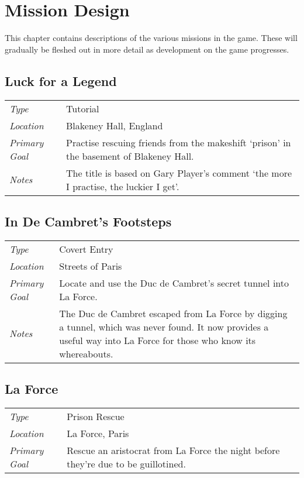 \chapter{Mission Design}

This chapter contains descriptions of the various missions in the game. These will gradually be fleshed out in more detail as development on the game progresses.

\section{Luck for a Legend}

\begin{tabular}{lp{12cm}}
\emph{Type} & Tutorial \\
\emph{Location} & Blakeney Hall, England \\
\emph{Primary Goal} & Practise rescuing friends from the makeshift `prison' in the basement of Blakeney Hall. \\
\emph{Notes} & The title is based on Gary Player's comment `the more I practise, the luckier I get'.
\end{tabular}

\section{In De Cambret's Footsteps}

\begin{tabular}{lp{12cm}}
\emph{Type} & Covert Entry \\
\emph{Location} & Streets of Paris \\
\emph{Primary Goal} & Locate and use the Duc de Cambret's secret tunnel into La Force. \\
\emph{Notes} & The Duc de Cambret escaped from La Force by digging a tunnel, which was never found. It now provides a useful way into La Force for those who know its whereabouts.
\end{tabular}

\section{La Force}

\begin{tabular}{lp{12cm}}
\emph{Type} & Prison Rescue \\
\emph{Location} & La Force, Paris \\
\emph{Primary Goal} & Rescue an aristocrat from La Force the night before they're due to be guillotined.
\end{tabular}

